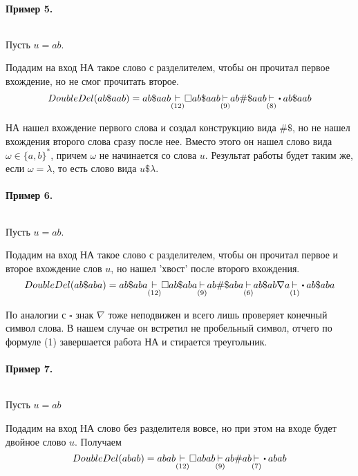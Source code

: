 \paragraph*{Пример 5.} ${}$ \newline

Пусть $u = ab$.

Подадим на вход НА такое слово с разделителем, чтобы он прочитал первое вхождение, но не смог
прочитать второе.
 \[
     DoubleDel(ab\$aab) = ab\$aab \underset{(12)}{\step} \square ab\$ aab
     \underset{(9)}{\step} ab\#\$aab \underset{(8)}{\step}\bigcdot ab\$aab
\] 

НА нашел вхождение первого слова и создал конструкцию вида $\#\$$, но не нашел
вхождения второго слова сразу после нее. Вместо этого он нашел слово вида
 $\omega \in \{a,b\}^{*}$, причем $\omega$ не начинается со слова $u$.
 Результат работы будет таким же,
 если $\omega = \lambda$, то есть слово вида  $u\$\lambda$.

\paragraph*{Пример 6.} ${}$ \newline

Пусть $u = ab$.

Подадим на вход НА такое слово с разделителем, чтобы он прочитал первое и второе вхождение
слов $u$, но нашел 'хвост' после второго вхождения.
 \[
     DoubleDel(ab\$aba) = ab\$aba \underset{(12)}{\step} \square ab\$ aba
     \underset{(9)}{\step} ab\#\$aba \underset{(6)}{\step} ab\$ab\nabla a
     \underset{(1)}{\step}\bigcdot ab\$aba
\] 

По аналогии с $\square$ знак  $\nabla $ тоже неподвижен и всего лишь проверяет
конечный символ слова. В нашем случае он встретил не пробельный символ, отчего
по формуле (1) завершается работа НА и стирается треугольник.

\paragraph*{Пример 7.} ${}$ \newline

Пусть $u = ab$ 

Подадим на вход НА слово без разделителя вовсе, но при этом на входе будет
двойное слово $u$. Получаем
 \[
     DoubleDel(abab) = abab \underset{(12)}{\step} \square abab
     \underset{(9)}{\step} ab\#ab \underset{(7)}{\step}\bigcdot abab
\] 


